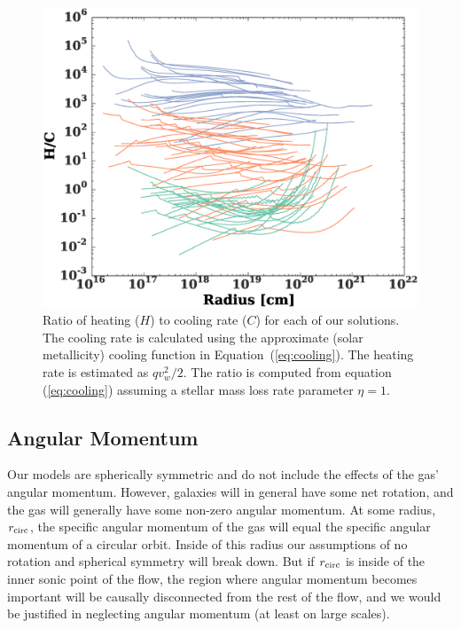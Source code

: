 \documentclass[usenatbib,fleqn]{mn2e}
\newcommand{\rcirc}{r_{\rm circ}}
\newcommand{\vw}{v_w}
\begin{document}
\begin{figure}
  \includegraphics[width=\columnwidth]{cooling.eps}
  \caption{\label{fig:cooling} Ratio of heating ($H$) to cooling rate
    ($C$) for each of our solutions. The cooling rate is calculated
    using the approximate (solar metallicity) cooling function in
    Equation~(\ref{eq:cooling}). The heating rate is estimated as $q
    \vw^2/2$. The ratio is computed from equation (\ref{eq:cooling})
    assuming a stellar mass loss rate parameter $\eta=1$.}
\end{figure}





  \subsection{Angular Momentum}
  \label{sec:ang}
  Our models are spherically symmetric and do not include the effects of
  the gas' angular momentum. However, galaxies will in general have some
  net rotation, and the gas will generally have some non-zero angular
  momentum. At some radius, $\rcirc$, the specific angular momentum of
  the gas will equal the specific angular momentum of a circular
  orbit. Inside of this radius our assumptions of no rotation and
  spherical symmetry will break down. But if $\rcirc$ is inside of the
  inner sonic point of the flow, the region where angular momentum
  becomes important will be causally disconnected from the rest of the
  flow, and we would be justified in neglecting angular momentum (at
  least on large scales).
\end{document}
